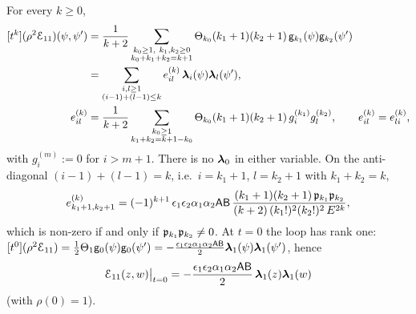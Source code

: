 \begin{thm}[(L3), all $k$]
\label{thm:lea-L3}
For every $k\geq 0$,
\begin{equation}
\label{eq:lea-L3}
\begin{aligned}
\coef{t^k}(\rho^2\Edge_{11})(\psi,\psi') &= \frac{1}{k+2}\sum_{\substack{k_0\geq 1,\ k_1,k_2\geq 0\\ k_0+k_1+k_2 = k+1}}\Thf_{k_0}(k_1+1)(k_2+1)\,\gl_{k_1}(\psi)\gl_{k_2}(\psi')\\
&= \sum_{\substack{i,l\geq 1\\ (i-1)+(l-1)\leq k}}e^{(k)}_{il}\,\lf_i(\psi)\lf_l(\psi'),\\
e^{(k)}_{il} &= \frac{1}{k+2}\sum_{\substack{k_0\geq 1\\ k_1+k_2 = k+1-k_0}}\Thf_{k_0}(k_1+1)(k_2+1)\,g_i^{(k_1)}g_l^{(k_2)},\qquad e^{(k)}_{il} = e^{(k)}_{li},
\end{aligned}
\end{equation}
with $g_i^{(m)} := 0$ for $i > m+1$. There is no $\boldsymbol{\lambda}_0$ in either variable. On the anti-diagonal $(i-1)+(l-1) = k$, i.e.\ $i = k_1+1$, $l = k_2+1$ with $k_1+k_2 = k$,
\begin{equation}
\label{eq:lea-anti}
e^{(k)}_{k_1+1,k_2+1} = (-1)^{k+1}\,\epsilon_1\epsilon_2\alpha_1\alpha_2\mathsf{A}\mathsf{B}\,\frac{(k_1+1)(k_2+1)\,\mathfrak{p}_{k_1}\mathfrak{p}_{k_2}}{(k+2)\,(k_1!)^2(k_2!)^2\,E^{2k}},
\end{equation}
which is non-zero if and only if $\mathfrak{p}_{k_1}\mathfrak{p}_{k_2}\neq 0$. At $t = 0$ the loop has rank one: $[t^0](\rho^2\mathcal{E}_{11}) = \frac12\Theta_1\mathsf{g}_0(\psi)\mathsf{g}_0(\psi') = -\frac{\epsilon_1\epsilon_2\alpha_1\alpha_2\mathsf{A}\mathsf{B}}{2}\boldsymbol{\lambda}_1(\psi)\boldsymbol{\lambda}_1(\psi')$, hence
\[
\mathcal{E}_{11}(z,w)\big|_{t=0} = -\frac{\epsilon_1\epsilon_2\alpha_1\alpha_2\mathsf{A}\mathsf{B}}{2}\,\boldsymbol{\lambda}_1(z)\boldsymbol{\lambda}_1(w)
\]
(with $\rho(0) = 1$).
\end{thm}


